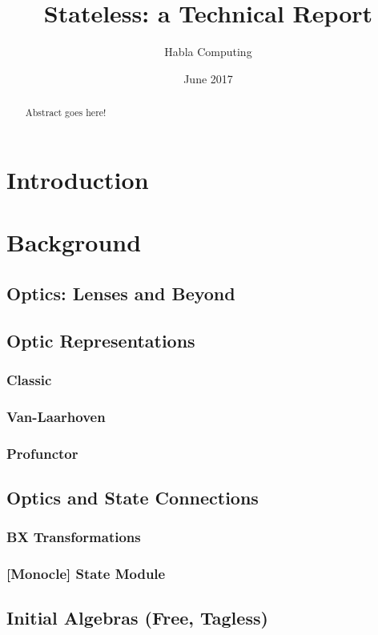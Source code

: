 \documentclass{report}
\begin{document}
\title{Stateless: a Technical Report}
\author{Habla Computing}
\date{June 2017}

\maketitle

\begin{abstract}

  Abstract goes here!

\end{abstract}

\tableofcontents

\chapter{Introduction}

\chapter{Background}
\section{Optics: Lenses and Beyond}
\section{Optic Representations}
\subsection{Classic}
\subsection{Van-Laarhoven}
\subsection{Profunctor}
\section{Optics and State Connections}
\subsection{BX Transformations}
\subsection{[Monocle] State Module}
\section{Initial Algebras (Free, Tagless)}
\end{document}
